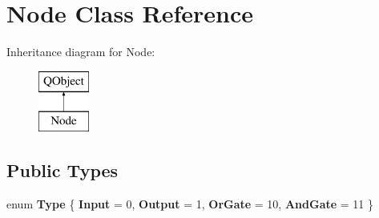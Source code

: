 \hypertarget{classNode}{}\section{Node Class Reference}
\label{classNode}
Inheritance diagram for Node\+:\begin{figure}[H]
\begin{center}
\leavevmode
\includegraphics[height=2.000000cm]{classNode}
\end{center}
\end{figure}
\subsection*{Public Types}
\begin{DoxyCompactItemize}
\item 
\mbox{\label{classNode_a8dad370be1595f49e0a7c2406a91e867}} 
enum {\bfseries Type} \{ \newline
{\bfseries Input} = 0, 
\newline
{\bfseries Output} = 1, 
\newline
{\bfseries Or\+Gate} = 10, 
\newline
{\bfseries And\+Gate} = 11
 \}
\end{DoxyCompactItemize}
